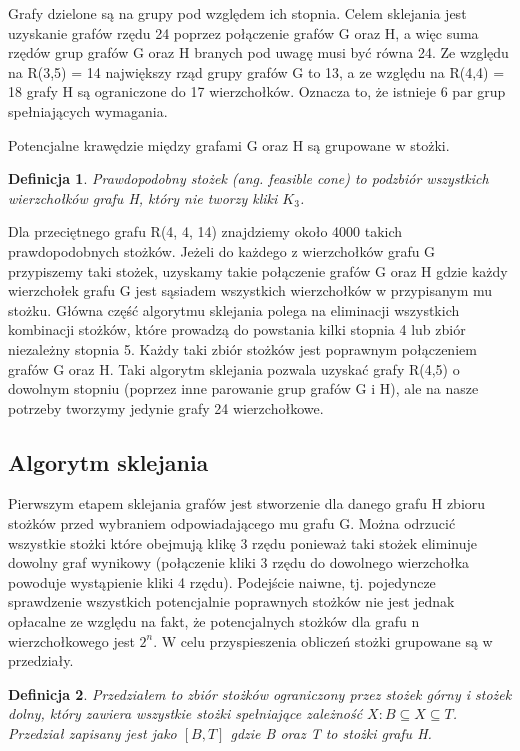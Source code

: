 \documentclass[11pt]{article}
\newtheorem{definition}{Definicja}[section]
\begin{document}
Grafy dzielone są na grupy pod względem ich stopnia. Celem sklejania jest uzyskanie grafów rzędu 24 poprzez połączenie grafów G oraz H, a więc suma rzędów grup grafów G oraz H branych pod uwagę musi być równa 24. Ze względu na R(3,5) = 14 największy rząd grupy grafów G to 13, a ze względu na R(4,4) = 18 grafy H są ograniczone do 17 wierzchołków. Oznacza to, że istnieje 6 par grup spełniających wymagania.

Potencjalne krawędzie między grafami G oraz H są grupowane w stożki.

\begin{definition}
Prawdopodobny stożek (ang. feasible cone) to podzbiór wszystkich wierzchołków grafu H, który nie tworzy kliki $K_3$.
\end{definition}

Dla przeciętnego grafu R(4, 4, 14) znajdziemy około 4000 takich prawdopodobnych stożków. Jeżeli do każdego z wierzchołków grafu G przypiszemy taki stożek, uzyskamy takie połączenie grafów G oraz H gdzie każdy wierzchołek grafu G jest sąsiadem wszystkich wierzchołków w przypisanym mu stożku. Główna część algorytmu sklejania polega na eliminacji wszystkich kombinacji stożków, które prowadzą do powstania kilki stopnia 4 lub zbiór niezależny stopnia 5. Każdy taki zbiór stożków jest poprawnym połączeniem grafów G oraz H. Taki algorytm sklejania pozwala uzyskać grafy R(4,5) o dowolnym stopniu (poprzez inne parowanie grup grafów G i H), ale na nasze potrzeby tworzymy jedynie grafy 24 wierzchołkowe.




\subsection{Algorytm sklejania}
Pierwszym etapem sklejania grafów jest stworzenie dla danego grafu H zbioru stożków przed wybraniem odpowiadającego mu grafu G. Można odrzucić wszystkie stożki które obejmują klikę 3 rzędu ponieważ taki stożek eliminuje dowolny graf wynikowy (połączenie kliki 3 rzędu do dowolnego wierzchołka powoduje wystąpienie kliki 4 rzędu). Podejście naiwne, tj. pojedyncze sprawdzenie wszystkich potencjalnie poprawnych stożków nie jest jednak opłacalne ze względu na fakt, że potencjalnych stożków dla grafu n wierzchołkowego jest $2^n$. W celu przyspieszenia obliczeń stożki grupowane są w przedziały. 

\begin{definition}
Przedziałem to zbiór stożków ograniczony przez stożek górny i stożek dolny, który zawiera wszystkie stożki spełniające zależność  $X: B \subseteq X \subseteq T$. Przedział zapisany jest jako $[B, T]$ gdzie B oraz T to stożki grafu H. 
\end{definition}
\end{document}
